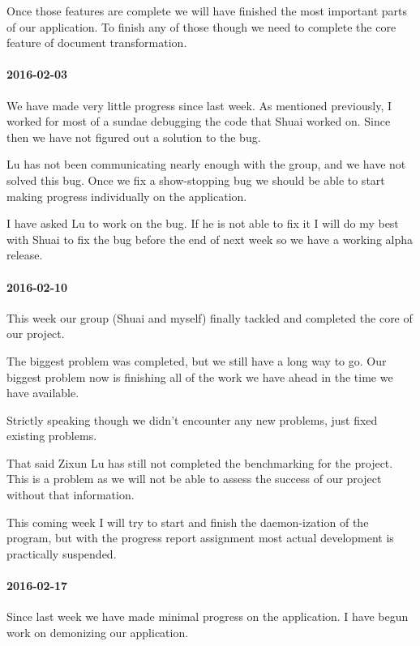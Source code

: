 Once those features are complete we will have finished the most important parts of our application.
To finish any of those though we need to complete the core feature of document transformation.

\paragraph{2016-02-03}

We have made very little progress since last week.
As mentioned previously, I worked for most of a sundae debugging the code that Shuai worked on.
Since then we have not figured out a solution to the bug.

Lu has not been communicating nearly enough with the group, and we have not solved this bug.
Once we fix a show-stopping bug we should be able to start making progress individually on the application.

I have asked Lu to work on the bug.
If he is not able to fix it I will do my best with Shuai to fix the bug before the end of next week so we have a working alpha release.

\paragraph{2016-02-10}

This week our group (Shuai and myself) finally tackled and completed the core of our project.

The biggest problem was completed, but we still have a long way to go.
Our biggest problem now is finishing all of the work we have ahead in the time we have available.

Strictly speaking though we didn't encounter any new problems, just fixed existing problems.

That said Zixun Lu has still not completed the benchmarking for the project.
This is a problem as we will not be able to assess the success of our project without that information.

This coming week I will try to start and finish the daemon-ization of the program, but with the progress report assignment most actual development is practically suspended.

\paragraph{2016-02-17}

Since last week we have made minimal progress on the application.
I have begun work on demonizing our application.

